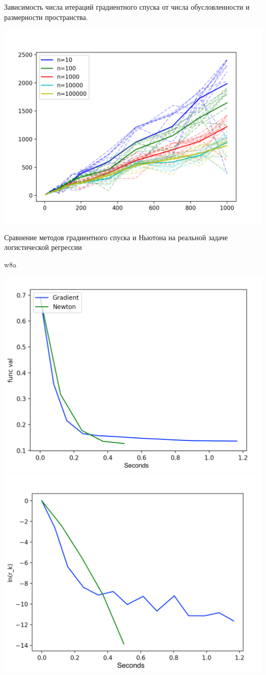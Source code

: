\documentclass{article}
\theoremstyle{definition}
\theoremstyle{remark}
\begin{document}
Зависимость числа итераций градиентного спуска от числа обусловленности и размерности пространства.

\includegraphics[width=1 \textwidth]{21.png}

Сравнение методов градиентного спуска и Ньютона на реальной задаче логистической регрессии

w8a

\includegraphics[width=0.6 \textwidth]{31.png}
\includegraphics[width=0.6 \textwidth]{32.png}
\end{document}
